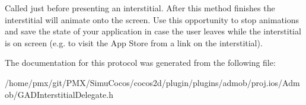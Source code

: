 Called just before presenting an interstitial. After this method finishes the interstitial will animate onto the screen. Use this opportunity to stop animations and save the state of your application in case the user leaves while the interstitial is on screen (e.\+g. to visit the App Store from a link on the interstitial). 

The documentation for this protocol was generated from the following file\+:\begin{DoxyCompactItemize}
\item 
/home/pmx/git/\+P\+M\+X/\+Simu\+Cocos/cocos2d/plugin/plugins/admob/proj.\+ios/\+Admob/G\+A\+D\+Interstitial\+Delegate.\+h\end{DoxyCompactItemize}
